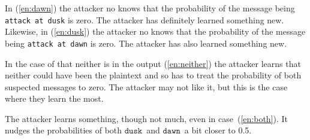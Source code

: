 \documentclass{article}
\newcommand\mdusk{\ensuremath{\mathtt{dusk}}}
\newcommand\mdawn{\ensuremath{\mathtt{dawn}}}
\begin{document}
In (\ref{en:dawn}) the attacker no knows that the probability of the message being \texttt{attack at dusk} is zero.
The attacker has definitely learned something new.
Likewise, in (\ref{en:dusk}) the attacker no knows that the probability of the message being \texttt{attack at dawn} is zero.
The attacker has also learned something new.

In the case of that neither is in the output (\ref{en:neither}) the attacker learns
that neither could have been the plaintext and so has to treat the probability of both suspected messages to zero. The attacker may not like it, but this is the case where they learn the most.

The attacker learns something, though not much, even in case~(\ref{en:both}).
It nudges the probabilities of both \mdusk\ and \mdawn\ a bit closer to 0.5.
\end{document}
